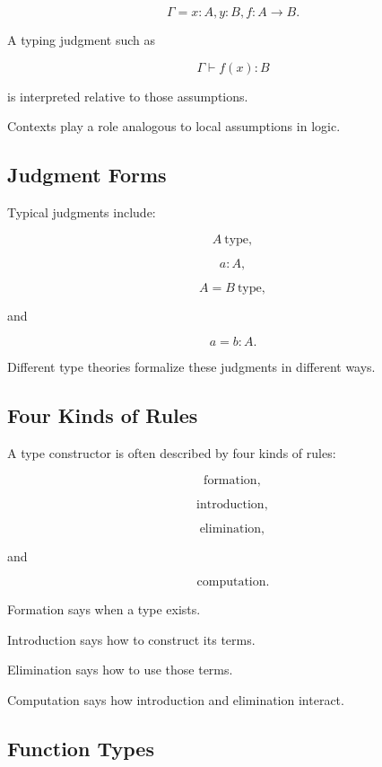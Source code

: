 \[
\boxed{
\Gamma
=
x:A,
y:B,
f:A\to B.
}
\]

A typing judgment such as

\[
\Gamma\vdash f(x):B
\]

is interpreted relative to those assumptions.

Contexts play a role analogous to local assumptions in logic.

\subsection{Judgment Forms}
\label{subsec:type-theory-judgment-forms}

Typical judgments include:

\[
\boxed{
A\ \text{type},
}
\]

\[
\boxed{
a:A,
}
\]

\[
\boxed{
A=B\ \text{type},
}
\]

and

\[
\boxed{
a=b:A.
}
\]

Different type theories formalize these judgments in different ways.

\subsection{Four Kinds of Rules}
\label{subsec:type-theory-four-rules}

A type constructor is often described by four kinds of rules:

\[
\boxed{
\text{formation},
}
\]

\[
\boxed{
\text{introduction},
}
\]

\[
\boxed{
\text{elimination},
}
\]

and

\[
\boxed{
\text{computation}.
}
\]

Formation says when a type exists.

Introduction says how to construct its terms.

Elimination says how to use those terms.

Computation says how introduction and elimination interact.

\subsection{Function Types}
\label{subsec:type-theory-function-types}

